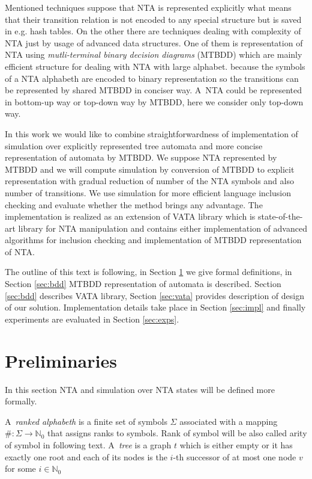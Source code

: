 \documentclass[a4paper, 12pt]{article}
\begin{document}
Mentioned techniques suppose that NTA is represented explicitly what means that their transition relation is not encoded to any special structure but
is saved in e.g. hash tables.
On the other there are techniques dealing with complexity of NTA just by usage of advanced data structures.
One of them is representation of NTA using \textit{mutli-terminal binary decision diagrams} (MTBDD) which are mainly efficient structure for dealing with NTA with large alphabet.
because the symbols of a NTA alphabeth are encoded to binary representation so the transitions can be represented by shared MTBDD in conciser way.
A~NTA could be represented in bottom-up way or top-down way by MTBDD, here we consider only top-down way.

In this work we would like to combine straightforwardness of implementation of simulation over explicitly
represented tree automata and more concise representation of automata by MTBDD.
We suppose NTA represented by MTBDD and we will compute simulation by conversion of MTBDD
to explicit representation with gradual reduction of number of the NTA symbols and also number of transitions.
We use simulation for more efficient language inclusion checking and evaluate whether the method brings any advantage.
The implementation is realized as an extension of VATA library which is state-of-the-art library for NTA manipulation
and contains either implementation of advanced algorithms for inclusion checking and implementation of MTBDD representation of NTA.

The outline of this text is following, in Section \ref{sec:analysis} we give formal definitions, in Section \ref{sec:bdd} MTBDD representation of automata is described.
Section \ref{sec:bdd} describes VATA library, Section \ref{sec:vata} provides description of design of our solution.
Implementation details take place in Section \ref{sec:impl} and finally experiments are evaluated in Section \ref{sec:exps}.

\section{Preliminaries}
\label{sec:analysis}
In this section NTA and simulation over NTA states will be defined more formally.

A~\emph{ranked alphabeth} is a finite set of symbols $\Sigma$ associated with a mapping $\#: \Sigma \rightarrow \mathbb{N}_0$
that assigns ranks to symbols.
Rank of symbol will be also called arity of symbol in following text.
A~\emph{tree} is a graph $t$ which is either empty or it has exactly one root and each of its
nodes is the $i$-th successor of at most one node $v$ for some $i \in \mathbb{N}_0$
\end{document}
